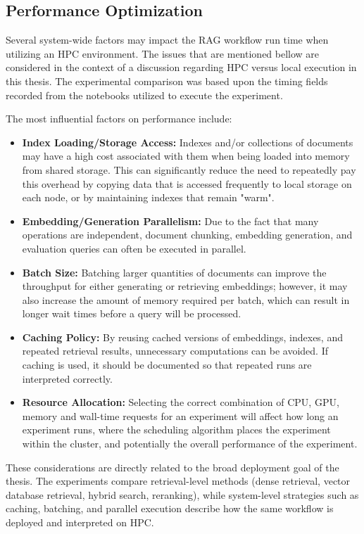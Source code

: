 \subsection{Performance Optimization}

Several system-wide factors may impact the \ac{RAG} workflow run time when utilizing an \ac{HPC} environment. The issues that are mentioned bellow are considered in the context of a discussion regarding \ac{HPC} versus local execution in this thesis. The experimental comparison was based upon the timing fields recorded from the notebooks utilized to execute the experiment.

The most influential factors on performance include:

\begin{itemize}
    \item \textbf{Index Loading/Storage Access:} Indexes and/or collections of documents may have a high cost associated with them when being loaded into memory from shared storage. This can significantly reduce the need to repeatedly pay this overhead by copying data that is accessed frequently to local storage on each node, or by maintaining indexes that remain "warm".
    \item \textbf{Embedding/Generation Parallelism:} Due to the fact that many operations are independent, document chunking, embedding generation, and evaluation queries can often be executed in parallel.
    \item \textbf{Batch Size:} Batching larger quantities of documents can improve the throughput for either generating or retrieving embeddings; however, it may also increase the amount of memory required per batch, which can result in longer wait times before a query will be processed.
    \item \textbf{Caching Policy:} By reusing cached versions of embeddings, indexes, and repeated retrieval results, unnecessary computations can be avoided. If caching is used, it should be documented so that repeated runs are interpreted correctly.
    \item \textbf{Resource Allocation:} Selecting the correct combination of \ac{CPU}, \ac{GPU}, memory and wall-time requests for an experiment will affect how long an experiment runs, where the scheduling algorithm places the experiment within the cluster, and potentially the overall performance of the experiment.
\end{itemize}

These considerations are directly related to the broad deployment goal of the thesis. The experiments compare retrieval-level methods (dense retrieval, vector database retrieval, hybrid search, reranking), while system-level strategies such as caching, batching, and parallel execution describe how the same workflow is deployed and interpreted on \ac{HPC}.

